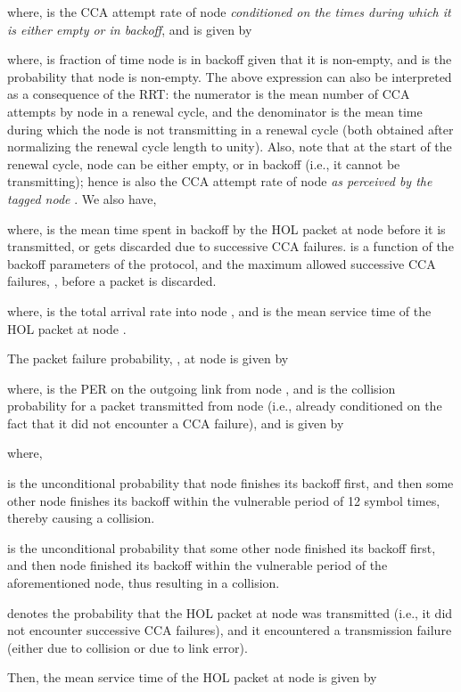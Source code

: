 \documentclass[12pt, draftclsnofoot, onecolumn]{IEEEtran}
\begin{document}
where,  is the CCA attempt rate of node  \emph{conditioned on the times during which it is either empty or in backoff}, and is given by 

where,  is fraction of time node  is in backoff given that it is non-empty, and  is the probability that node  is non-empty. The above expression can also be interpreted as a consequence of the RRT: the numerator is the mean number of CCA attempts by node  in a renewal cycle, and the denominator is the mean time during which the node  is not transmitting in a renewal cycle (both obtained after normalizing the renewal cycle length to unity). Also, note that at the start of the renewal cycle, node  can be either empty, or in backoff (i.e., it cannot be transmitting); hence  is also the CCA attempt rate of node  \emph{as perceived by the tagged node }. We also have,

where,  is the mean time spent in backoff by the HOL packet at node  before it is transmitted, or gets discarded due to successive CCA failures.  is a function of the backoff parameters of the protocol, and the maximum allowed successive CCA failures, , before a packet is discarded. 


where,  is the total arrival rate into node , and  is the mean service time of the HOL packet at node . 

The packet failure probability, , at node  is given by

where,  is the PER on the outgoing link from node , and  is the collision probability for a packet transmitted from node  (i.e., already conditioned on the fact that it did not encounter a CCA failure), and is given by

where,

is the unconditional probability that node  finishes its backoff first, and then some other node finishes its backoff within the vulnerable period of 12 symbol times, thereby causing a collision.
 

is the unconditional probability that some other node finished its backoff first, and then node  finished its backoff within the vulnerable period of the aforementioned node, thus resulting in a collision.

 denotes the probability that the HOL packet at node  was transmitted (i.e., it did not encounter  successive CCA failures), and it encountered a transmission failure (either due to collision or due to link error).
 
Then, the mean service time of the HOL packet at node  is given by
\end{document}
